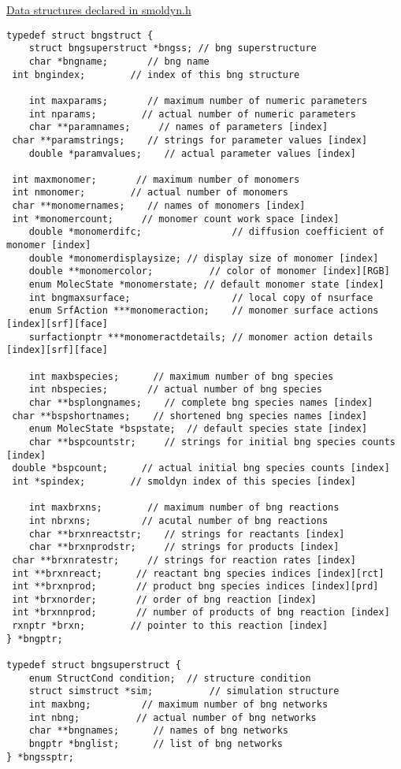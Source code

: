 \documentclass {book}
\begin{document}
\underline{Data structures declared in smoldyn.h}

\begin{lstlisting}
typedef struct bngstruct {
	struct bngsuperstruct *bngss; // bng superstructure
	char *bngname;       // bng name
 int bngindex;        // index of this bng structure
 
	int maxparams;       // maximum number of numeric parameters
	int nparams;        // actual number of numeric parameters
	char **paramnames;     // names of parameters [index]
 char **paramstrings;    // strings for parameter values [index]
	double *paramvalues;    // actual parameter values [index]
 
 int maxmonomer;       // maximum number of monomers
 int nmonomer;        // actual number of monomers
 char **monomernames;    // names of monomers [index]
 int *monomercount;     // monomer count work space [index]
	double *monomerdifc;				// diffusion coefficient of monomer [index]
	double *monomerdisplaysize;	// display size of monomer [index]
	double **monomercolor;			// color of monomer [index][RGB]
	enum MolecState *monomerstate; // default monomer state [index]
	int bngmaxsurface;					// local copy of nsurface
	enum SrfAction ***monomeraction;	// monomer surface actions [index][srf][face]
	surfactionptr ***monomeractdetails;	// monomer action details [index][srf][face]

	int maxbspecies;      // maximum number of bng species
	int nbspecies;       // actual number of bng species
	char **bsplongnames;    // complete bng species names [index]
 char **bspshortnames;    // shortened bng species names [index]
	enum MolecState *bspstate;	// default species state [index]
	char **bspcountstr;     // strings for initial bng species counts [index]
 double *bspcount;      // actual initial bng species counts [index]
 int *spindex;        // smoldyn index of this species [index]

	int maxbrxns;        // maximum number of bng reactions
	int nbrxns;         // acutal number of bng reactions
	char **brxnreactstr;    // strings for reactants [index]
	char **brxnprodstr;     // strings for products [index]
 char **brxnratestr;     // strings for reaction rates [index]
 int **brxnreact;      // reactant bng species indices [index][rct]
 int **brxnprod;       // product bng species indices [index][prd]
 int *brxnorder;       // order of bng reaction [index]
 int *brxnnprod;       // number of products of bng reaction [index]
 rxnptr *brxn;        // pointer to this reaction [index]
} *bngptr;

typedef struct bngsuperstruct {
	enum StructCond condition;	// structure condition
	struct simstruct *sim;			// simulation structure
	int maxbng;         // maximum number of bng networks
	int nbng;          // actual number of bng networks
	char **bngnames;      // names of bng networks
	bngptr *bnglist;      // list of bng networks
} *bngssptr;
\end{lstlisting}
\end{document}
